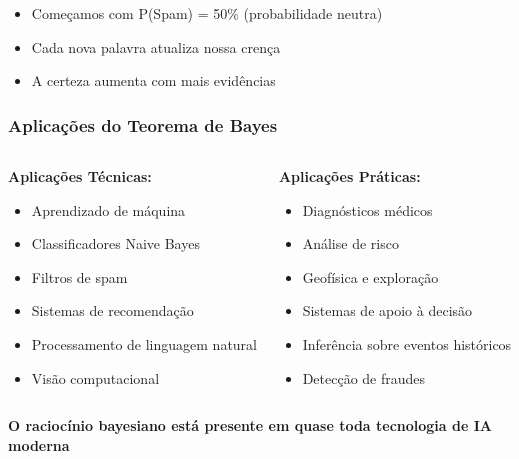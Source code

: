 \documentclass[11pt]{beamer}
\begin{document}
\begin{frame}
\begin{frame}
\begin{itemize}
\item Começamos com P(Spam) = 50\% (probabilidade neutra)
\item Cada nova palavra atualiza nossa crença
\item A certeza aumenta com mais evidências
\end{itemize}
\end{frame}

\begin{frame}
\frametitle{Aplicações do Teorema de Bayes}
\begin{columns}
\begin{column}{0.48\textwidth}
\textbf{Aplicações Técnicas:}
\begin{itemize}
\item Aprendizado de máquina
\item Classificadores Naive Bayes
\item Filtros de spam
\item Sistemas de recomendação
\item Processamento de linguagem natural
\item Visão computacional
\end{itemize}
\end{column}

\begin{column}{0.48\textwidth}
\textbf{Aplicações Práticas:}
\begin{itemize}
\item Diagnósticos médicos
\item Análise de risco
\item Geofísica e exploração
\item Sistemas de apoio à decisão
\item Inferência sobre eventos históricos
\item Detecção de fraudes
\end{itemize}
\end{column}
\end{columns}

\vspace{0.5cm}
\begin{center}
\textbf{O raciocínio bayesiano está presente em quase toda tecnologia de IA moderna}
\end{center}
\end{frame}


\end{frame}
\end{document}
